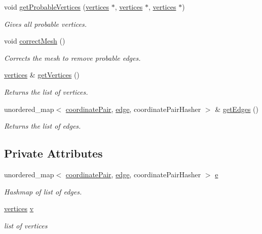 \begin{DoxyCompactItemize}
void \mbox{\hyperlink{classedges_a0feaa97509484a534614d92b6865d34b}{get\+Probable\+Vertices}} (\mbox{\hyperlink{classvertices}{vertices}} $\ast$, \mbox{\hyperlink{classvertices}{vertices}} $\ast$, \mbox{\hyperlink{classvertices}{vertices}} $\ast$)
\begin{DoxyCompactList}\small\item\em Gives all probable vertices. \end{DoxyCompactList}\item 
void \mbox{\hyperlink{classedges_a51fcc59ce1ad81ef7a3dcce1b5a417a0}{correct\+Mesh}} ()
\begin{DoxyCompactList}\small\item\em Corrects the mesh to remove probable edges. \end{DoxyCompactList}\item 
\mbox{\hyperlink{classvertices}{vertices}} \& \mbox{\hyperlink{classedges_a134a326c5f08d0a256a978e6b8a51e85}{get\+Vertices}} ()
\begin{DoxyCompactList}\small\item\em Returns the list of vertices. \end{DoxyCompactList}\item 
unordered\+\_\+map$<$ \mbox{\hyperlink{structcoordinate_pair}{coordinate\+Pair}}, \mbox{\hyperlink{structedge}{edge}}, coordinate\+Pair\+Hasher $>$ \& \mbox{\hyperlink{classedges_a5a24034feb3fe92e609d1c572d076e4e}{get\+Edges}} ()
\begin{DoxyCompactList}\small\item\em Returns the list of edges. \end{DoxyCompactList}\end{DoxyCompactItemize}
\subsection*{Private Attributes}
\begin{DoxyCompactItemize}
\item 
unordered\+\_\+map$<$ \mbox{\hyperlink{structcoordinate_pair}{coordinate\+Pair}}, \mbox{\hyperlink{structedge}{edge}}, coordinate\+Pair\+Hasher $>$ \mbox{\hyperlink{classedges_afc125c17ccbdc0e6fd9728c46b8161d6}{e}}
\begin{DoxyCompactList}\small\item\em Hashmap of list of edges. \end{DoxyCompactList}\item 
\mbox{\hyperlink{classvertices}{vertices}} \mbox{\hyperlink{classedges_ae7d192ac53a71df3fef15146552351fa}{v}}
\begin{DoxyCompactList}\small\item\em list of vertices \end{DoxyCompactList}\end{DoxyCompactItemize}



